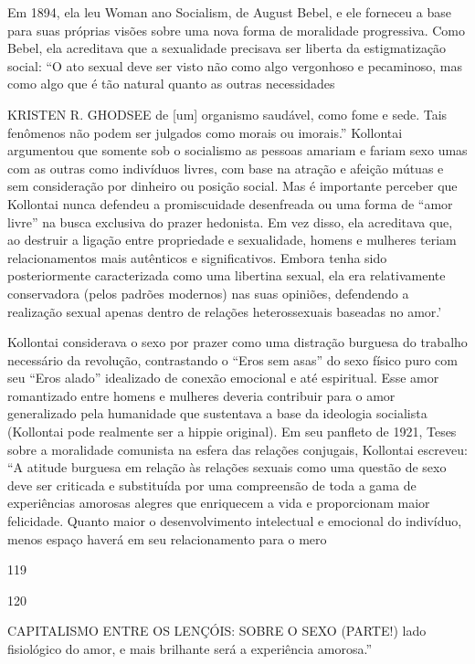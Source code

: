  \par 
Em 1894, ela leu Woman ano Socialism, de August Bebel, e ele forneceu a base para suas próprias visões sobre uma nova forma de moralidade progressiva. Como Bebel, ela acreditava que a sexualidade precisava ser liberta da estigmatização social: “O ato sexual deve ser visto não como algo vergonhoso e pecaminoso, mas como algo que é tão natural quanto as outras necessidades
 \par 
KRISTEN R. GHODSEE de [um] organismo saudável, como fome e sede. Tais fenômenos não podem ser julgados como morais ou imorais.” Kollontai argumentou que somente sob o socialismo as pessoas amariam e fariam sexo umas com as outras como indivíduos livres, com base na atração e afeição mútuas e sem consideração por dinheiro ou posição social. Mas é importante perceber que Kollontai nunca defendeu a promiscuidade desenfreada ou uma forma de “amor livre” na busca exclusiva do prazer hedonista. Em vez disso, ela acreditava que, ao destruir a ligação entre propriedade e sexualidade, homens e mulheres teriam relacionamentos mais autênticos e significativos. Embora tenha sido posteriormente caracterizada como uma libertina sexual, ela era relativamente conservadora (pelos padrões modernos) nas suas opiniões, defendendo a realização sexual apenas dentro de relações heterossexuais baseadas no amor.’
 \par 
Kollontai considerava o sexo por prazer como uma distração burguesa do trabalho necessário da revolução, contrastando o “Eros sem asas” do sexo físico puro com seu “Eros alado” idealizado de conexão emocional e até espiritual. Esse amor romantizado entre homens e mulheres deveria contribuir para o amor generalizado pela humanidade que sustentava a base da ideologia socialista (Kollontai pode realmente ser a hippie original). Em seu panfleto de 1921, Teses sobre a moralidade comunista na esfera das relações conjugais, Kollontai escreveu: “A atitude burguesa em relação às relações sexuais como uma questão de sexo deve ser criticada e substituída por uma compreensão de toda a gama de experiências amorosas alegres que enriquecem a vida e proporcionam maior felicidade. Quanto maior o desenvolvimento intelectual e emocional do indivíduo, menos espaço haverá em seu relacionamento para o mero
 \par 
119
 \par 
120
 \par 
CAPITALISMO ENTRE OS LENÇÓIS: SOBRE O SEXO (PARTE!) lado fisiológico do amor, e mais brilhante será a experiência amorosa.”
 \par 

